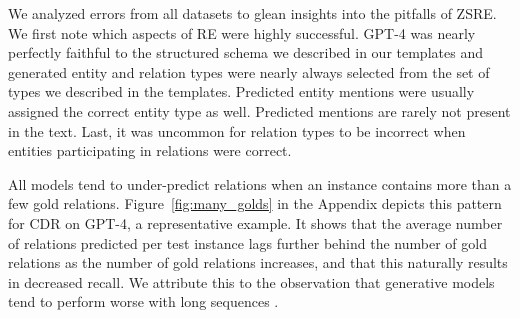 \documentclass[11pt]{article}
\begin{document}
We analyzed errors from all datasets to glean insights into the pitfalls of ZSRE.  We first note which aspects of RE were highly successful.  GPT-4 was nearly perfectly faithful to the structured schema we described in our templates and generated entity and relation types were nearly always selected from the set of types we described in the templates.  Predicted entity mentions were usually assigned the correct entity type as well.  Predicted mentions are rarely not present in the text. Last, it was uncommon for relation types to be incorrect when entities participating in relations were correct.

All models tend to under-predict relations when an instance contains more than a few gold relations. Figure~\ref{fig:many_golds} in the Appendix depicts this pattern for CDR on GPT-4, a representative example. It shows that the average number of relations predicted per test instance lags further behind the number of gold relations as the number of gold relations increases, and that this naturally results in decreased recall.  We attribute this to the observation that generative models tend to perform worse with long sequences \cite{hochreiter2001gradient, 10.1162/tacl_a_00531}.
\end{document}
